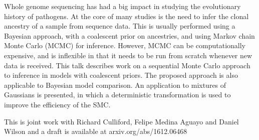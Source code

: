 Whole genome sequencing has had a big impact in studying the evolutionary history of pathogens. At the core of many studies is the need to infer the clonal ancestry of a sample from sequence data. This is usually performed using a Bayesian approach, with a coalescent prior on ancestries, and using Markov chain Monte Carlo (MCMC) for inference. However, MCMC can be computationally expensive, and is inflexible in that it needs to be run from scratch whenever new data is received. This talk describes work on a sequential Monte Carlo approach to inference in models with coalescent priors. The proposed approach is also applicable to Bayesian model comparison. An application to mixtures of Gaussians is presented, in which a deterministic transformation is used to improve the efficiency of the SMC.

This is joint work with Richard Culliford, Felipe Medina Aguayo and Daniel Wilson and a draft is available at arxiv.org/abs/1612.06468